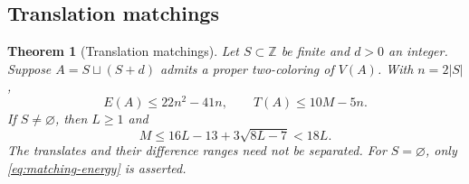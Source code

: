 \documentclass[11pt,a4paper]{article}
\newtheorem{theorem}{Theorem}[section]
\theoremstyle{definition}
\newcommand{\Z}{\mathbb Z}
\numberwithin{equation}{section}
\begin{document}
\subsection{Translation matchings}
\begin{theorem}[Translation matchings]\label{thm:matching}
Let $S\subset\Z$ be finite and $d>0$ an integer. Suppose $A=S\sqcup(S+d)$ admits a proper two-coloring of $V(A)$. With $n=2|S|$,
\begin{equation}\label{eq:matching-energy}
E(A)\le22n^2-41n,\qquad T(A)\le10M-5n.
\end{equation}
If $S\ne\varnothing$, then $L\ge1$ and
\begin{equation}\label{eq:matching-span}
M\le16L-13+3\sqrt{8L-7}<18L.
\end{equation}
The translates and their difference ranges need not be separated. For $S=\varnothing$, only \eqref{eq:matching-energy} is asserted.
\end{theorem}
\end{document}
